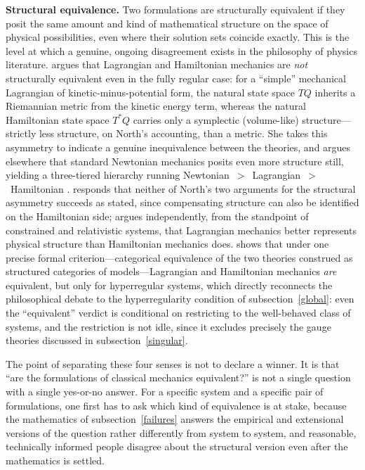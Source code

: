 \textbf{Structural equivalence.} Two formulations are structurally equivalent
if they posit the same amount and kind of mathematical structure on the space
of physical possibilities, even where their solution sets coincide exactly.
This is the level at which a genuine, ongoing disagreement exists in the
philosophy of physics literature. \cite{north2009} argues that Lagrangian and
Hamiltonian mechanics are \emph{not} structurally equivalent even in the fully
regular case: for a ``simple'' mechanical Lagrangian of kinetic-minus-potential
form, the natural state space $TQ$ inherits a Riemannian metric from the
kinetic energy term, whereas the natural Hamiltonian state space $T^*Q$ carries
only a symplectic (volume-like) structure---strictly less structure, on North's
accounting, than a metric. She takes this asymmetry to indicate a genuine
inequivalence between the theories, and argues elsewhere that standard
Newtonian mechanics posits even more structure still, yielding a three-tiered
hierarchy running Newtonian~$>$~Lagrangian~$>$~Hamiltonian \cite{north2022}.
\cite{barrett2015} responds that neither of North's two arguments for the
structural asymmetry succeeds as stated, since compensating structure can also
be identified on the Hamiltonian side; \cite{curiel2014} argues independently,
from the standpoint of constrained and relativistic systems, that Lagrangian
mechanics better represents physical structure than Hamiltonian mechanics does.
\cite{barrett2019} shows that under one precise formal criterion---categorical
equivalence of the two theories construed as structured categories of
models---Lagrangian and Hamiltonian mechanics \emph{are} equivalent, but only
for hyperregular systems, which directly reconnects the philosophical debate to
the hyperregularity condition of subsection~\ref{global}: even the
``equivalent'' verdict is conditional on restricting to the well-behaved class
of systems, and the restriction is not idle, since it excludes precisely the
gauge theories discussed in subsection~\ref{singular}.

The point of separating these four senses is not to declare a winner. It is
that ``are the formulations of classical mechanics equivalent?'' is not a
single question with a single yes-or-no answer. For a specific system and a
specific pair of formulations, one first has to ask which kind of equivalence
is at stake, because the mathematics of subsection~\ref{failures} answers the
empirical and extensional versions of the question rather differently from
system to system, and reasonable, technically informed people disagree about
the structural version even after the mathematics is settled.

